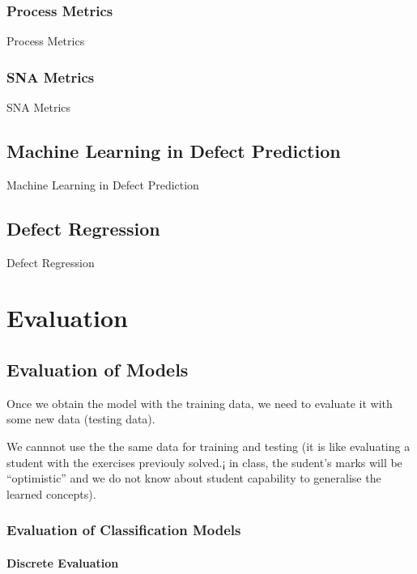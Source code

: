 \documentclass[]{book}
\theoremstyle{definition}
\theoremstyle{definition}
\theoremstyle{remark}
\begin{document}
{\section{Process Metrics}\label{process-metrics}

Process Metrics

\section{SNA Metrics}\label{sna-metrics}

SNA Metrics

\chapter{Machine Learning in Defect
Prediction}\label{machine-learning-in-defect-prediction}

Machine Learning in Defect Prediction

\chapter{Defect Regression}\label{defect-regression}

Defect Regression

\part{Evaluation}\label{part-evaluation}

\chapter{Evaluation of Models}\label{evaluation-of-models}

Once we obtain the model with the training data, we need to evaluate it
with some new data (testing data).

We cannnot use the the same data for training and testing (it is like
evaluating a student with the exercises previouly solved.¡ in class, the
sudent's marks will be ``optimistic'' and we do not know about student
capability to generalise the learned concepts).

\section{Evaluation of Classification
Models}\label{evaluation-of-classification-models}

\subsection{Discrete Evaluation}\label{discrete-evaluation}

}
\end{document}
